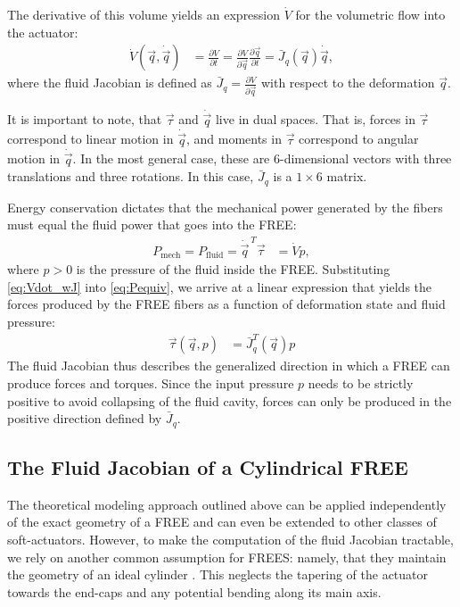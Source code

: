 The derivative of this volume yields an expression $\dot{V}$ for the volumetric flow into the actuator:
\begin{align}
    \dot{V} (\vec{q}, \dot{\vec{q}}) &= \frac{\partial V}{\partial t} = \frac{\partial V}{\partial \vec{q}} \frac{\partial \vec{q}}{\partial t } = \bar{J}_q (\vec{q}) \dot{\vec{q}},  \label{eq:Vdot_wJ}
\end{align}
where the fluid Jacobian is defined as $\bar{J}_{q}= \frac{\partial V}{\partial \vec{q}}$ with respect to the deformation $\vec{q}$. 


It is important to note, that $\vec{\tau}$ and $\dot{\vec{q}}$ live in dual spaces. 
That is, forces in $\vec{\tau}$ correspond to linear motion in $\dot{\vec{q}}$, and moments in $\vec{\tau}$ correspond to angular motion in $\dot{\vec{q}}$.
In the most general case, these are 6-dimensional vectors with three translations and three rotations.
In this case, $\bar{J}_q$ is a $1 \times 6$ matrix.


Energy conservation dictates that the mechanical power generated by the fibers must equal the fluid power that goes into the FREE:
\begin{align}
    P_{\text{mech}} = P_{\text{fluid}} = \dot{\vec{q}}^{\,T} \vec{\tau} &= \dot{V} p, 
    \label{eq:Pequiv}
\end{align}
%
where $p>0$ is the pressure of the fluid inside the FREE.
Substituting \eqref{eq:Vdot_wJ} into \eqref{eq:Pequiv}, we arrive at a linear expression that yields the forces produced by the FREE fibers as a function of deformation state and fluid pressure: 
\begin{align}
    \vec{\tau} (\vec{q}, p) &= \bar{J}_q^T (\vec{q}) p       \label{eq:fiberF}
\end{align}
The fluid Jacobian thus describes the generalized direction in which a FREE can produce forces and torques.
Since the input pressure $p$ needs to be strictly positive to avoid collapsing of the fluid cavity, forces can only be produced in the positive direction defined by $\bar{J}_q$.


\subsection{The Fluid Jacobian of a Cylindrical FREE}
The theoretical modeling approach outlined above can be applied independently of the exact geometry of a FREE and can even be extended to other classes of soft-actuators.
However, to make the computation of the fluid Jacobian tractable, we rely on another common assumption for FREES: namely, that they maintain the geometry of an ideal cylinder \cite{bishop2015design}.
This neglects the tapering of the actuator towards the end-caps and any potential bending along its main axis.

